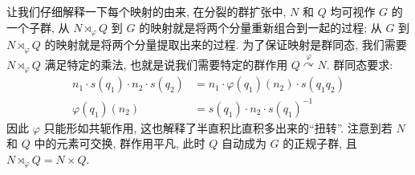 \begin{remark}
        让我们仔细解释一下每个映射的由来, 在分裂的群扩张中, $N$ 和 $Q$ 均可视作 $G$ 的一个子群, 从 $N\rtimes_{\varphi}Q$ 到 $G$ 的映射就是将两个分量重新组合到一起的过程;
        从 $G$ 到 $N\rtimes_{\varphi}Q$ 的映射就是将两个分量提取出来的过程. 为了保证映射是群同态, 我们需要 $N\rtimes_{\varphi}Q$ 满足特定的乘法, 也就是说我们需要特定的群作用 
        $Q\overset{\varphi}{\curvearrowright}N$. 群同态要求:
        \begin{align*}
            n_1\cdot s(q_1)\cdot n_2\cdot s(q_2)&=n_1\cdot \varphi(q_1)(n_2)\cdot s(q_1q_2) \\
            \varphi(q_1)(n_2)&=s(q_1)\cdot n_2\cdot s(q_1)^{-1}
        \end{align*}
        因此 $\varphi$ 只能形如共轭作用, 这也解释了半直积比直积多出来的“扭转”. 注意到若 $N$ 和 $Q$ 中的元素可交换, 群作用平凡, 此时 $Q$ 自动成为 $G$ 的正规子群, 且 $N\rtimes_{\varphi}Q = N\times Q$.
    \end{remark}